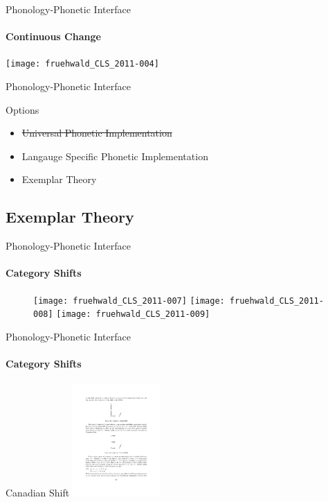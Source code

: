 \documentclass[]{beamer}
\begin{document}
\begin{frame}{Phonology-Phonetic Interface}
	\framesubtitle{Continuous Change}

\texttt{[image: fruehwald\_CLS\_2011-004]}
	
	
\end{frame}

\begin{frame}{Phonology-Phonetic Interface}

	\begin{block}{Options}
		\begin{itemize}
			\item \sout{Universal Phonetic Implementation}
			\item Langauge Specific Phonetic Implementation
			\item Exemplar Theory
		\end{itemize}
	\end{block}

\end{frame}

\subsection{Exemplar Theory}





\begin{frame}{Phonology-Phonetic Interface}
	\framesubtitle{Category Shifts}
\begin{figure}
\texttt{[image: fruehwald\_CLS\_2011-007]}
\texttt{[image: fruehwald\_CLS\_2011-008]}
\texttt{[image: fruehwald\_CLS\_2011-009]}


\end{figure}
\end{frame}




\begin{frame}{Phonology-Phonetic Interface}
	\framesubtitle{Category Shifts}
\begin{block}{Canadian Shift}
	\includegraphics[width = 0.25\textwidth]{figures/canshift.pdf}
\end{block}
\end{frame}
\end{document}
